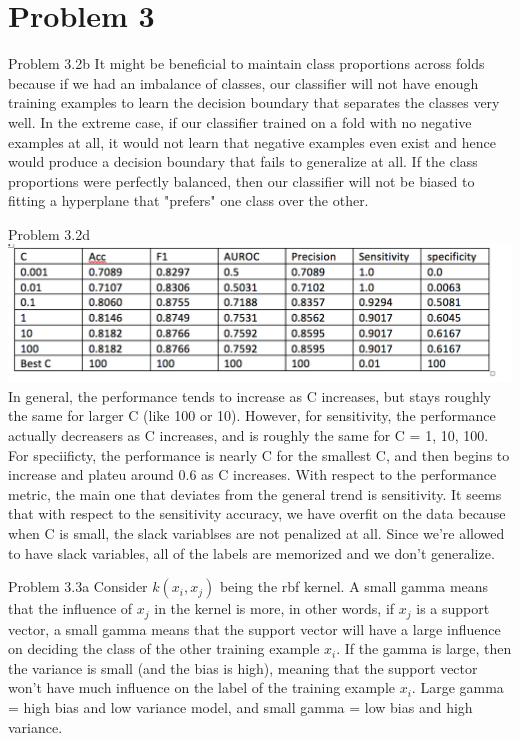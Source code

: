 \documentclass[11pt]{article}
\newcommand{\solution}[1]{{{\color{blue}{\bf Solution:} {#1}}}}
\begin{document}
\section{Problem 3}
\item Problem 3.2b
\solution{
It might be beneficial to maintain class proportions across folds because if we had an imbalance of classes, our classifier will not have enough training examples to learn the decision boundary that separates the classes very well. In the extreme case, if our classifier trained on a fold with no negative examples at all, it would not learn that negative examples even exist and hence would produce a decision boundary that fails to generalize at all. If the class proportions were perfectly balanced, then our classifier will not be biased to fitting a hyperplane that "prefers" one class over the other. 
}
\item Problem 3.2d \newline{}
\includegraphics[scale=0.75]{t1.png}
\newline{}
In general, the performance tends to increase as C increases, but stays roughly the same for larger C (like 100 or 10). However, for sensitivity, the performance actually decreasers as C increases, and is roughly the same for C = 1, 10, 100. For speciificty, the performance is nearly C for the smallest C, and then begins to increase and plateu around 0.6 as C increases. With respect to the performance metric, the main one that deviates from the general trend is sensitivity. It seems that with respect to the sensitivity accuracy, we have overfit on the data because when C is small, the slack variablses are not penalized at all. Since we're allowed to have slack variables, all of the labels are memorized and we don't generalize. 
\item Problem 3.3a
\solution{
Consider $k(x_i, x_j)$ being the rbf kernel. A small gamma means that the influence of $x_j$ in the kernel is more, in other words, if $x_j$ is a support vector, a small gamma means that the support vector will have a large influence on deciding the class of the other training example $x_i$. If the gamma is large, then the variance is small (and the bias is high), meaning that the support vector won't have much influence on the label of the training example $x_i$. Large gamma = high bias and low variance model, and small gamma = low bias and high variance. 
}
\end{document}
